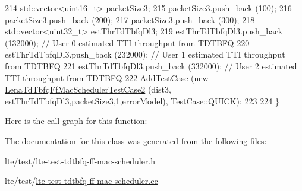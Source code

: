 \begin{DoxyCode}
214   std::vector<uint16\_t> packetSize3;
215   packetSize3.push\_back (100);
216   packetSize3.push\_back (200);
217   packetSize3.push\_back (300);
218   std::vector<uint32\_t> estThrTdTbfqDl3;
219   estThrTdTbfqDl3.push\_back (132000); \textcolor{comment}{// User 0 estimated TTI throughput from TDTBFQ}
220   estThrTdTbfqDl3.push\_back (232000); \textcolor{comment}{// User 1 estimated TTI throughput from TDTBFQ}
221   estThrTdTbfqDl3.push\_back (332000); \textcolor{comment}{// User 2 estimated TTI throughput from TDTBFQ}
222   \hyperlink{classns3_1_1TestCase_a3718088e3eefd5d6454569d2e0ddd835}{AddTestCase} (\textcolor{keyword}{new} \hyperlink{classLenaTdTbfqFfMacSchedulerTestCase2}{LenaTdTbfqFfMacSchedulerTestCase2} (dist3,
      estThrTdTbfqDl3,packetSize3,1,errorModel), TestCase::QUICK);
223 
224 \}
\end{DoxyCode}


Here is the call graph for this function\+:




The documentation for this class was generated from the following files\+:\begin{DoxyCompactItemize}
\item 
lte/test/\hyperlink{lte-test-tdtbfq-ff-mac-scheduler_8h}{lte-\/test-\/tdtbfq-\/ff-\/mac-\/scheduler.\+h}\item 
lte/test/\hyperlink{lte-test-tdtbfq-ff-mac-scheduler_8cc}{lte-\/test-\/tdtbfq-\/ff-\/mac-\/scheduler.\+cc}\end{DoxyCompactItemize}
